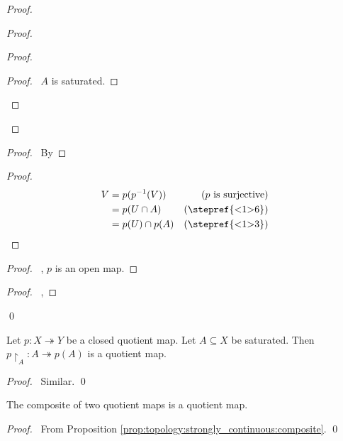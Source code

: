 \begin{proof}
\begin{proof}
\begin{proof}
      \begin{proof}
        \pf\ $A$ is saturated.
      \end{proof}
    \end{proof}
  \end{proof}
  \begin{proof}
    \pf\ By 
  \end{proof}
  \begin{proof}
    \pf
    \begin{align*}
      V & = p(p^{-1}(V)) & (p \text{ is surjective}) \\
      & = p(U \cap A) & (\text{\stepref{<1>6}}) \\
      & = p(U) \cap p(A) & (\text{\stepref{<1>3}})
    \end{align*}
  \end{proof}
  \begin{proof}
    \pf\ , $p$ is an open map.
  \end{proof}
  \begin{proof}
    \pf\ , 
  \end{proof}
  \qed
\end{proof}

\begin{prop}
  Let $p : X \twoheadrightarrow Y$ be a closed quotient map. Let $A \subseteq
  X$ be
  saturated. Then $p \restriction_A : A \twoheadrightarrow p(A)$ is a
  quotient map.
\end{prop}

\begin{proof}
  \pf\ Similar. \qed
\end{proof}

\begin{prop}
  \label{prop:topology:quotient:composite}
  The composite of two quotient maps is a quotient map.
\end{prop}

\begin{proof}
  \pf\ From Proposition \ref{prop:topology:strongly_continuous:composite}.
  \qed
\end{proof}

